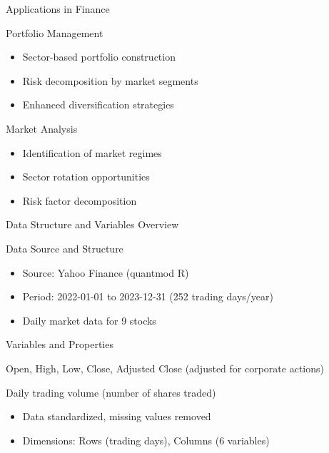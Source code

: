 \documentclass{beamer}
\begin{document}
\begin{frame}{Applications in Finance}
    \begin{block}{Portfolio Management}
        \begin{itemize}
            \item Sector-based portfolio construction
            \item Risk decomposition by market segments
            \item Enhanced diversification strategies
        \end{itemize}
    \end{block}

    \begin{block}{Market Analysis}
        \begin{itemize}
            \item Identification of market regimes
            \item Sector rotation opportunities
            \item Risk factor decomposition
        \end{itemize}
    \end{block}
\end{frame}

\begin{frame}{Data Structure and Variables Overview}

    \begin{block}{Data Source and Structure}
        \begin{itemize}
            \item Source: Yahoo Finance (quantmod R)
            \item Period: 2022-01-01 to 2023-12-31 (252 trading days/year)
            \item Daily market data for 9 stocks
        \end{itemize}
    \end{block}

    \begin{block}{Variables and Properties}
        \begin{description}\setlength{\itemsep}{1pt}
            \item[Price] Open, High, Low, Close, Adjusted Close (adjusted for corporate actions)
            \item[Volume] Daily trading volume (number of shares traded)
        \end{description}
        \vspace{4mm}
        \begin{itemize}
            \item Data standardized, missing values removed
            \item Dimensions: Rows (trading days), Columns (6 variables)
        \end{itemize}
    \end{block}


\end{frame}
\end{document}
